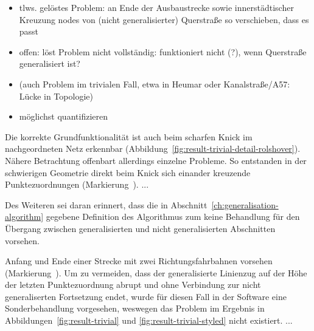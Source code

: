 \documentclass[../main/thesis.tex]{subfiles}
\begin{document}
\begin{itemize}
\item tlws. gelöstes Problem: an Ende der Ausbaustrecke sowie innerstädtischer Kreuzung nodes von (nicht generalisierter) Querstraße so verschieben, dass es passt
\item offen: löst Problem nicht vollständig: funktioniert nicht (?), wenn Querstraße generalisiert ist?
\item (auch Problem im trivialen Fall, etwa in Heumar oder Kanalstraße/A57: Lücke in Topologie)
\item möglichst quantifizieren
\end{itemize}


Die korrekte Grundfunktionalität ist auch beim scharfen Knick im nachgeordneten Netz
erkennbar (Abbildung~\ref{fig:result-trivial-detail-rolshover}).
Nähere Betrachtung offenbart allerdings einzelne Probleme.
So entstanden in der schwierigen Geometrie direkt beim Knick sich einander kreuzende Punktezuordnungen (Markierung~).
...

Des Weiteren sei daran erinnert, dass die in Abschnitt~\ref{ch:generalisation-algorithm} gegebene Definition des Algorithmus zum  keine Behandlung für den Übergang zwischen generalisierten und nicht generalisierten Abschnitten vorsehen.

Anfang und Ende einer Strecke mit zwei Richtungsfahrbahnen vorsehen (Markierung~).
Um zu vermeiden, dass der generalisierte Linienzug auf der Höhe der letzten Punktezuordnung abrupt und ohne Verbindung zur nicht generaliserten Fortsetzung endet, wurde für diesen Fall in der Software eine Sonderbehandlung vorgesehen, weswegen das Problem im Ergebnis in Abbildungen~\ref{fig:result-trivial} und \ref{fig:result-trivial-styled} nicht existiert.
...
\end{document}
